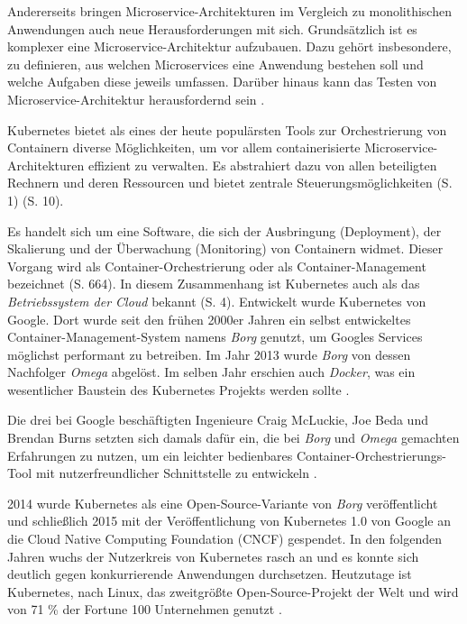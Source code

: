 \documentclass[11pt,a4paper]{article}
\begin{document}
Andererseits bringen Microservice-Architekturen im Vergleich zu monolithischen Anwendungen
auch neue Herausforderungen mit sich.
Grundsätzlich ist es komplexer eine Microservice-Architektur aufzubauen.
Dazu gehört insbesondere, zu definieren, aus welchen Microservices eine Anwendung bestehen soll
und welche Aufgaben diese jeweils umfassen. Darüber hinaus kann das Testen von Microservice-Architektur
herausfordernd sein \cite{8406008}.

Kubernetes bietet als eines der heute populärsten Tools zur Orchestrierung von Containern
diverse Möglichkeiten, um vor allem containerisierte Microservice-Architekturen effizient zu verwalten.
Es abstrahiert dazu von allen beteiligten Rechnern und deren Ressourcen und bietet zentrale Steuerungsmöglichkeiten
\cite{Schmeling_Dargatz_2022} (S. 1) \cite{cicd_with_kubernetes_devops} (S. 10).

Es handelt sich um eine Software, die sich der Ausbringung (Deployment),
der Skalierung und der Überwachung (Monitoring) von Containern widmet.
Dieser Vorgang wird als Container-Orchestrierung
oder als Container-Management bezeichnet \cite{Bisong2019} (S. 664).
In diesem Zusammenhang ist Kubernetes auch als das \emph{Betriebssystem der Cloud} bekannt
\cite{Schmeling_Dargatz_2022} (S. 4).
Entwickelt wurde Kubernetes von Google. Dort wurde seit den frühen 2000er Jahren
ein selbst entwickeltes Container-Management-System namens \emph{Borg} \cite{43438} genutzt,
um Googles Services möglichst performant zu betreiben.
Im Jahr 2013 wurde \emph{Borg} von dessen Nachfolger \emph{Omega} abgelöst. Im selben Jahr erschien auch \emph{Docker},
was ein wesentlicher Baustein des Kubernetes
Projekts werden sollte \cite{ibm_history}.

Die drei bei Google beschäftigten Ingenieure Craig McLuckie, Joe Beda und Brendan Burns setzten sich damals dafür ein,
die bei \emph{Borg} und \emph{Omega} gemachten Erfahrungen zu nutzen, um ein leichter bedienbares Container-Orchestrierungs-Tool
mit nutzerfreundlicher Schnittstelle zu entwickeln \cite{ibm_history}.

2014 wurde Kubernetes als eine Open-Source-Variante von \emph{Borg} veröffentlicht
und schließlich 2015 mit der Veröffentlichung von Kubernetes 1.0
von Google an die Cloud Native Computing Foundation (CNCF) gespendet.
In den folgenden Jahren wuchs der Nutzerkreis von Kubernetes
rasch an und es konnte sich deutlich gegen konkurrierende Anwendungen durchsetzen.
Heutzutage ist Kubernetes, nach Linux, das zweitgrößte Open-Source-Projekt der Welt und wird von 71 \% der Fortune 100 Unternehmen genutzt
\cite{ibm_history} \cite{kubernetes_journey}.
\end{document}
